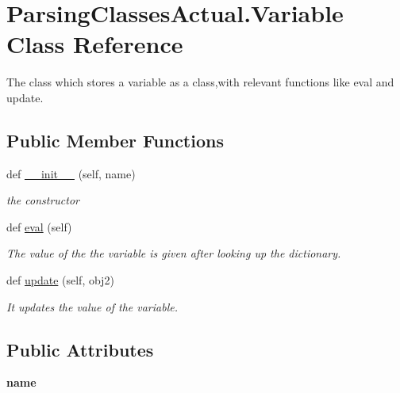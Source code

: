 \hypertarget{class_parsing_classes_actual_1_1_variable}{}\section{Parsing\+Classes\+Actual.\+Variable Class Reference}
\label{class_parsing_classes_actual_1_1_variable}


The class which stores a variable as a class,with relevant functions like eval and update.  


\subsection*{Public Member Functions}
\begin{DoxyCompactItemize}
\item 
def \hyperlink{class_parsing_classes_actual_1_1_variable_a1e45d0c6cdb70b7f36a432914a530364}{\+\_\+\+\_\+init\+\_\+\+\_\+} (self, name)
\begin{DoxyCompactList}\small\item\em the constructor \end{DoxyCompactList}\item 
\mbox{\label{class_parsing_classes_actual_1_1_variable_ad10453c7fa8c6067a3e20ca7b15a9b0e}} 
def \hyperlink{class_parsing_classes_actual_1_1_variable_ad10453c7fa8c6067a3e20ca7b15a9b0e}{eval} (self)
\begin{DoxyCompactList}\small\item\em The value of the the variable is given after looking up the dictionary. \end{DoxyCompactList}\item 
def \hyperlink{class_parsing_classes_actual_1_1_variable_ac3a39c7351d2b51b097903733af3f7ec}{update} (self, obj2)
\begin{DoxyCompactList}\small\item\em It updates the value of the variable. \end{DoxyCompactList}\end{DoxyCompactItemize}
\subsection*{Public Attributes}
\begin{DoxyCompactItemize}
\item 
\mbox{\label{class_parsing_classes_actual_1_1_variable_ada0de9ca99f5a48b167a472f2f03d100}} 
{\bfseries name}
\end{DoxyCompactItemize}


